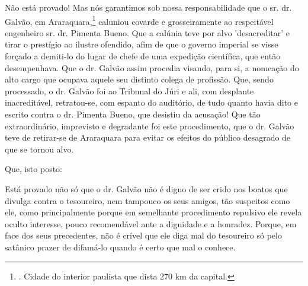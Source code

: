 Não está provado! Mas nós garantimos sob nossa responsabilidade que o
sr. dr. Galvão, em Araraquara,\footnote{. Cidade do interior paulista
  que dista 270 km da capital.} caluniou covarde e grosseiramente ao
respeitável engenheiro sr. dr. Pimenta Bueno. Que a calúnia teve por
alvo 'desacreditar' e tirar o prestígio ao ilustre ofendido, afim de que
o governo imperial se visse forçado a demiti-lo do lugar de chefe de uma
expedição científica, que então desempenhava. Que o dr. Galvão assim
procedia visando, para si, a nomeação do alto cargo que ocupava aquele
seu distinto colega de profissão. Que, sendo processado, o dr. Galvão
foi ao Tribunal do Júri e ali, com desplante inacreditável, retratou-se,
com espanto do auditório, de tudo quanto havia dito e escrito contra o
dr. Pimenta Bueno, que desistiu da acusação! Que tão extraordinário,
imprevisto e degradante foi este procedimento, que o dr. Galvão teve de
retirar-se de Araraquara para evitar os efeitos do público desagrado de
que se tornou alvo.

Que, isto posto:

Está provado não só que o dr. Galvão não é digno de ser crido nos boatos
que divulga contra o tesoureiro, nem tampouco os seus amigos, tão
suspeitos como ele, como principalmente porque em semelhante
procedimento repulsivo ele revela oculto interesse, pouco recomendável
ante a dignidade e a honradez. Porque, em face dos seus precedentes, não
é crível que ele diga mal do tesoureiro só pelo satânico prazer de
difamá-lo quando é certo que mal o conhece.

